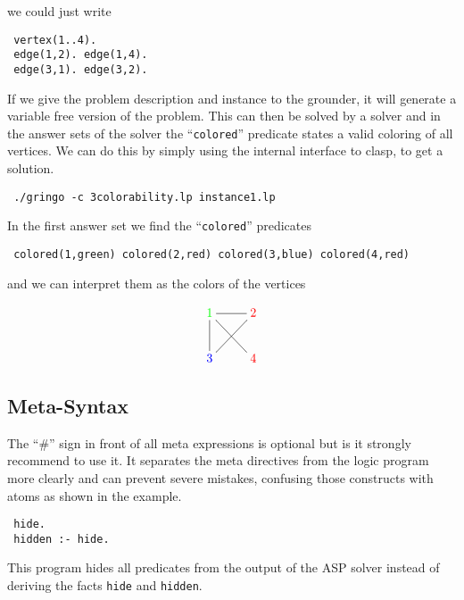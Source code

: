 \documentclass[a4paper,10pt]{article}
\begin{document}
we could just write
\begin{verbatim}
 vertex(1..4).
 edge(1,2). edge(1,4).
 edge(3,1). edge(3,2).
\end{verbatim}

If we give the problem description and instance to the grounder, it will generate a variable free version of the problem. This can then be solved by a solver and in the answer sets of the solver the ``\texttt{colored}'' predicate states a valid coloring of all vertices.
We can do this by simply using the internal interface to clasp, to get a solution.
\begin{verbatim}
 ./gringo -c 3colorability.lp instance1.lp
\end{verbatim}
In the first answer set we find the ``\texttt{colored}'' predicates
\begin{verbatim}
 colored(1,green) colored(2,red) colored(3,blue) colored(4,red)
\end{verbatim}
and we can interpret them as the colors of the vertices
 
\[
 \xymatrix{\color{green}1\ar@{-}[dr]\ar@{-}[d]\ar@{-}[r]&\color{red}2\ar@{-}[dl]\\
           \color{blue}3&\color{red}4}
\]

\subsection{Meta-Syntax}
The ``\#'' sign in front of all meta expressions is optional but is it strongly recommend to use it.
It separates the meta directives from the logic program more clearly and can prevent severe mistakes,
 confusing those constructs with atoms as shown in the example.
\begin{verbatim}
 hide.
 hidden :- hide.
\end{verbatim}
This program hides all predicates from the output of the ASP solver instead of deriving the facts \texttt{hide} and \texttt{hidden}.
\end{document}
